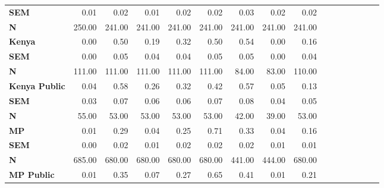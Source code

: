 \begin{tabular}{@{\extracolsep{5pt}}lrrrrrrrrrrrrrrr}
{\bf SEM} & 0.01\phantom{***} & 0.02\phantom{***} & 0.01\phantom{***} & 0.02\phantom{***} & 0.02\phantom{***} & 0.03\phantom{***} & 0.02\phantom{***} & 0.02\phantom{***} \\
{\bf N} & 250.00\phantom{***} & 241.00\phantom{***} & 241.00\phantom{***} & 241.00\phantom{***} & 241.00\phantom{***} & 241.00\phantom{***} & 241.00\phantom{***} & 241.00\phantom{***} \\
{\bf Kenya} & 0.00\phantom{***} & 0.50\phantom{***} & 0.19\phantom{***} & 0.32\phantom{***} & 0.50\phantom{***} & 0.54\phantom{***} & 0.00\phantom{***} & 0.16\phantom{***} \\
{\bf SEM} & 0.00\phantom{***} & 0.05\phantom{***} & 0.04\phantom{***} & 0.04\phantom{***} & 0.05\phantom{***} & 0.05\phantom{***} & 0.00\phantom{***} & 0.04\phantom{***} \\
{\bf N} & 111.00\phantom{***} & 111.00\phantom{***} & 111.00\phantom{***} & 111.00\phantom{***} & 111.00\phantom{***} & 84.00\phantom{***} & 83.00\phantom{***} & 110.00\phantom{***} \\
{\bf Kenya Public} & 0.04\phantom{***} & 0.58\phantom{***} & 0.26\phantom{***} & 0.32\phantom{***} & 0.42\phantom{***} & 0.57\phantom{***} & 0.05\phantom{***} & 0.13\phantom{***} \\
{\bf SEM} & 0.03\phantom{***} & 0.07\phantom{***} & 0.06\phantom{***} & 0.06\phantom{***} & 0.07\phantom{***} & 0.08\phantom{***} & 0.04\phantom{***} & 0.05\phantom{***} \\
{\bf N} & 55.00\phantom{***} & 53.00\phantom{***} & 53.00\phantom{***} & 53.00\phantom{***} & 53.00\phantom{***} & 42.00\phantom{***} & 39.00\phantom{***} & 53.00\phantom{***} \\
{\bf MP} & 0.01\phantom{***} & 0.29\phantom{***} & 0.04\phantom{***} & 0.25\phantom{***} & 0.71\phantom{***} & 0.33\phantom{***} & 0.04\phantom{***} & 0.16\phantom{***} \\
{\bf SEM} & 0.00\phantom{***} & 0.02\phantom{***} & 0.01\phantom{***} & 0.02\phantom{***} & 0.02\phantom{***} & 0.02\phantom{***} & 0.01\phantom{***} & 0.01\phantom{***} \\
{\bf N} & 685.00\phantom{***} & 680.00\phantom{***} & 680.00\phantom{***} & 680.00\phantom{***} & 680.00\phantom{***} & 441.00\phantom{***} & 444.00\phantom{***} & 680.00\phantom{***} \\
{\bf MP Public} & 0.01\phantom{***} & 0.35\phantom{***} & 0.07\phantom{***} & 0.27\phantom{***} & 0.65\phantom{***} & 0.41\phantom{***} & 0.01\phantom{***} & 0.21\phantom{***} \\

\end{tabular}
